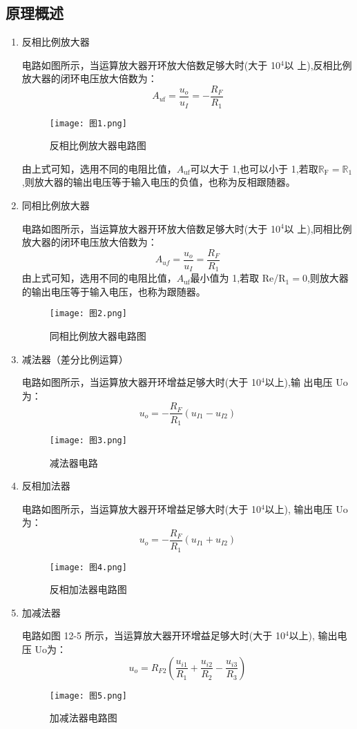 \documentclass[dvipsnames, svgnames,a4paper,11pt]{article}
\begin{document}
	\subsection{原理概述}
	\begin{enumerate}
		\item 反相比例放大器
		
		电路如图所示，当运算放大器开环放大倍数足够大时(大于 10$^{4}$以
		上),反相比例放大器的闭环电压放大倍数为：
		$$A_{u\text{f}}=\frac{u_o}{u_I}=-\frac{R_F}{R_1}$$
\begin{figure}[{H}]
	\centering
	\texttt{[image: 图1.png]}
	\caption{反相比例放大器电路图}
	\label{}
\end{figure}

		由上式可知，选用不同的电阻比值，$A_\mathrm{uf}$可以大于 1,也可以小于 1,若取$\mathbb{R}_{\mathrm{F}}=\mathbb{R}_{1}$,则放大器的输出电压等于输入电压的负值，也称为反相跟随器。
		\item 同相比例放大器
		
		电路如图所示，当运算放大器开环放大倍数足够大时(大于 10$^{4}$以
上),同相比例放大器的闭环电压放大倍数为：
$$A_{uf}=\frac{u_o}{u_I}=\frac{R_F}{R_1}$$
由上式可知，选用不同的电阻比值，$A_\mathrm{uf}$最小值为 1,若取 Re/R$_1=0$,则放大器的输出电压等于输入电压，也称为跟随器。
\begin{figure}[{H}]
	\centering
	\texttt{[image: 图2.png]}
	\caption{同相比例放大器电路图}
	\label{}
\end{figure}
\item 减法器（差分比例运算）

电路如图所示，当运算放大器开环增益足够大时(大于 10$^{4}$以上),输
出电压 Uo为：
$$u_o=-\frac{R_F}{R_1}(u_{I1}-u_{I2})$$
\begin{figure}[{H}]
	\centering
	\texttt{[image: 图3.png]}
	\caption{减法器电路}
	\label{}
\end{figure}
\item 反相加法器

电路如图所示，当运算放大器开环增益足够大时(大于 10$^{4}$以上),
输出电压 Uo为：
$$u_o=-\frac{R_F}{R_1}(u_{I1}+u_{I2})$$
\begin{figure}[{H}]
	\centering
	\texttt{[image: 图4.png]}
	\caption{反相加法器电路图}
	\label{}
\end{figure}
\item 加减法器

电路如图 12-5 所示，当运算放大器开环增益足够大时(大于 10$^{4}$以上),
输出电压 Uo为：
$$u_o=R_{F2}(\frac{u_{i1}}{R_1}+\frac{u_{i2}}{R_2}-\frac{u_{i3}}{R_3})$$
\begin{figure}[{H}]
	\centering
	\texttt{[image: 图5.png]}
	\caption{加减法器电路图}
	\label{}
\end{figure}
	\end{enumerate}
	
\end{document}
